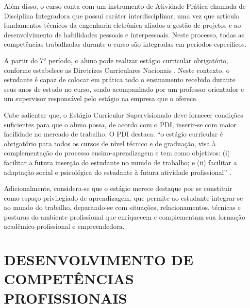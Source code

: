 Além disso, o curso conta com um instrumento de Atividade Prática chamada de Disciplina Integradora que possui caráter interdisciplinar, uma vez que articula fundamentos técnicos da engenharia eletrônica aliados a gestão de projetos e ao desenvolvimento de habilidades pessoais e interpessoais. Neste processo, todas as competências trabalhadas durante o curso são integradas em períodos específicos. %

A partir do 7º período, o aluno pode realizar estágio curricular obrigatório, conforme estabelece as Diretrizes Curriculares Nacionais \cite{dcneng}. Neste contexto, o estudante é capaz de colocar em prática todo o ensinamento recebido durante seus anos de estudo no curso, sendo acompanhado por um professor orientador e um supervisor responsável pelo estágio na empresa que o oferece.

Cabe salientar que, o Estágio Curricular Supervisionado deve fornecer condições suficientes para que o aluno possa, de acordo com o PDI, inserir-se com maior facilidade no mercado de trabalho. O PDI destaca: “o estágio curricular é obrigatório para todos os cursos de nível técnico e de graduação, visa à complementação do processo ensino-aprendizagem e tem como objetivos: (i) facilitar a futura inserção do estudante no mundo de trabalho; e (ii) facilitar a adaptação social e psicológica do estudante à futura atividade profissional” \cite{pdiutfpr}.

Adicionalmente, considera-se que o estágio merece destaque por se constituir como espaço privilegiado de aprendizagem, que permite ao estudante integrar-se ao mundo do trabalho, deparando-se com situações, relacionamentos, técnicas e posturas do ambiente profissional que enriquecem e complementam sua formação acadêmico-profissional e empreendedora.

\section{DESENVOLVIMENTO DE COMPETÊNCIAS PROFISSIONAIS}
\label{sec:desen}



